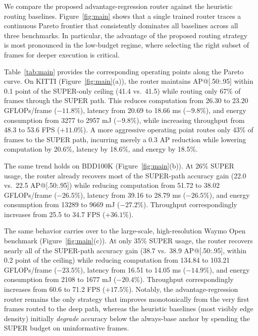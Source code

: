 We compare the proposed advantage-regression router against the heuristic routing baselines. 
Figure~\ref{fig:main} shows that a single trained router traces a continuous Pareto frontier that consistently dominates all baselines across all three benchmarks.
In particular, the advantage of the proposed routing strategy is most pronounced in the low-budget regime, where selecting the right subset of frames for deeper execution is critical.

Table~\ref{tab:main} provides the corresponding operating points along the Pareto curve. 
On KITTI (Figure~\ref{fig:main}(a)), the router maintains AP@[.50:.95] within 0.1 point of the SUPER-only ceiling (41.4 vs.\ 41.5) while routing only 67\% of frames through the SUPER path. 
This reduces computation from 26.30 to 23.20 GFLOPs/frame ($-11.8\%$), latency from 20.69 to 18.66 ms ($-9.8\%$), and energy consumption from 3277 to 2957 mJ ($-9.8\%$), while increasing throughput from 48.3 to 53.6 FPS ($+11.0\%$). 
A more aggressive operating point routes only 43\% of frames to the SUPER path, incurring merely a 0.3 AP reduction while lowering computation by 20.6\%, latency by 18.6\%, and energy by 18.5\%.

The same trend holds on BDD100K (Figure~\ref{fig:main}(b)). 
At 26\% SUPER usage, the router already recovers most of the SUPER-path accuracy gain (22.0 vs.\ 22.5 AP@[.50:.95]) while reducing computation from 51.72 to 38.02 GFLOPs/frame ($-26.5\%$), latency from 39.16 to 28.79 ms ($-26.5\%$), and energy consumption from 13289 to 9669 mJ ($-27.2\%$). 
Throughput correspondingly increases from 25.5 to 34.7 FPS ($+36.1\%$).

The same behavior carries over to the large-scale, high-resolution Waymo Open benchmark (Figure~\ref{fig:main}(c)).
At only 35\% SUPER usage, the router recovers nearly all of the SUPER-path accuracy gain (38.7 vs.\ 38.9 AP@[.50:.95], within 0.2 point of the ceiling) while reducing computation from 134.84 to 103.21 GFLOPs/frame ($-23.5\%$), latency from 16.51 to 14.05 ms ($-14.9\%$), and energy consumption from 2108 to 1677 mJ ($-20.4\%$).
Throughput correspondingly increases from 60.6 to 71.2 FPS ($+17.5\%$).
Notably, the advantage-regression router remains the only strategy that improves monotonically from the very first frames routed to the deep path, whereas the heuristic baselines (most visibly edge density) initially \emph{degrade} accuracy below the always-base anchor by spending the SUPER budget on uninformative frames.



